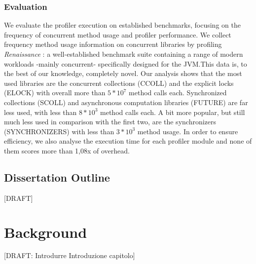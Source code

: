 \documentclass[]{usiinfthesis}
\begin{document}
\subsection{Evaluation}
We evaluate the profiler execution on established benchmarks, focusing on the frequency of concurrent method usage and profiler performance. We collect frequency method usage information on concurrent libraries by profiling \textit{Renaissance} \cite{Renaissance}: a well-established benchmark suite containing a range of modern workloads -mainly concurrent- specifically designed for the JVM.This data is, to the best of our knowledge, completely novel. Our analysis shows that the most used libraries are the concurrent collections (CCOLL) and the explicit locks (ELOCK) with overall more than \(5*10^7\) method calls each. Synchronized collections (SCOLL) and asynchronous computation libraries (FUTURE) are far less used, with less than \(8*10^3\) method calls each. A bit more popular, but still much less used in comparison with the first two, are the synchronizers (SYNCHRONIZERS) with less than \(3*10^3\) method usage. In order to ensure efficiency, we also analyse the execution time for each profiler module and none of them scores more than 1,08x of overhead.

\section{Dissertation Outline}
[DRAFT]


\chapter{Background}

[DRAFT: Introdurre Introduzione capitolo]
\end{document}
